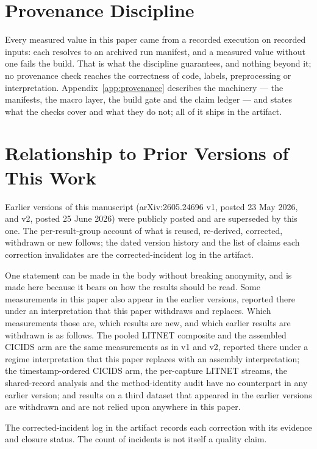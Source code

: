 \documentclass[manuscript,screen,nonacm]{acmart}
\begin{document}
\section{Provenance Discipline}
\label{sec:provenance}

Every measured value in this paper came from a recorded execution on recorded
inputs: each resolves to an archived run manifest, and a measured value without
one fails the build. That is what the discipline guarantees, and nothing beyond
it; no provenance check reaches the correctness of code, labels, preprocessing
or interpretation. Appendix~\ref{app:provenance} describes the machinery ---
the manifests, the macro layer, the build gate and the claim ledger --- and
states what the checks cover and what they do not; all of it ships in the
artifact.

\section{Relationship to Prior Versions of This Work}
\label{sec:disclosure}

Earlier versions of this manuscript (arXiv:2605.24696 v1, posted 23 May 2026,
and v2, posted 25 June 2026) were publicly posted and are superseded by this
one. The per-result-group account of what is reused, re-derived, corrected,
withdrawn or new follows; the dated version history and the list of claims
each correction invalidates are the corrected-incident log in the artifact.

One statement can be made in the body without breaking anonymity, and is
made here because it bears on how the results should be read. Some
measurements in this paper also appear in the earlier versions, reported there
under an interpretation that this paper withdraws and replaces. Which
measurements those are, which results are new, and which earlier results are
withdrawn is as follows. The pooled LITNET composite and the assembled CICIDS arm
are the same measurements as in v1 and v2, reported there under a regime
interpretation that this paper replaces with an assembly interpretation;
the timestamp-ordered CICIDS arm, the per-capture LITNET streams, the
shared-record analysis and the method-identity audit have no counterpart
in any earlier version; and results on a third dataset that appeared in
the earlier versions are withdrawn and are not relied upon anywhere in
this paper.

The corrected-incident log in the artifact records each correction with its
evidence and closure status. The count of incidents is not itself a quality
claim.
\end{document}
